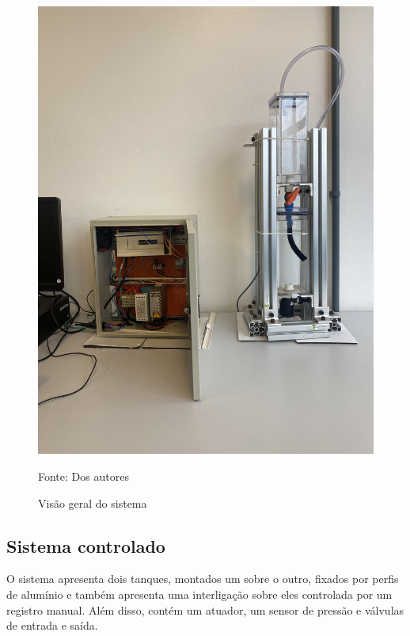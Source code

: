 \begin{figure}[H]
    \centering\footnotesize
    \caption{Visão geral do sistema}
        \begin{center}
        \includegraphics[scale=0.1]{imagens/sistema_geral.jpg}
    \end{center}
    \label{fig:esq}
    \par Fonte: Dos autores
\end{figure}

\subsection{Sistema controlado}
\hspace{11mm}O sistema apresenta dois tanques, montados um sobre o outro, fixados por perfis de alumínio e também apresenta uma interligação sobre eles controlada por um registro manual. Além disso, contém um atuador, um sensor de pressão e válvulas de entrada e saída.


